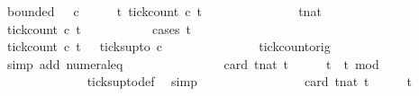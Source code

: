\begin{isabellebody}
\isanewline
{}\isamarkupfalse%
\ {\isacartoucheopen}bounded\ {}\ {}\ c{}{\isacartoucheclose}\isanewline
%
\isadelimproof
%
\endisadelimproof
%
\isatagproof
{}\isamarkupfalse%
\ {\isacharminus}\isanewline
\ \ \isamarkupfalse%
\ {\isacartoucheopen}{\isasymforall}t{\isachardot}\ tick{\isacharunderscore}count\ c{}\ t\ {}\ {\isasymle}\ {}{\isacartoucheclose}\isanewline
\ \ \isamarkupfalse%
\ {\isacharminus}\isanewline
\ \ \ \ \isacommand{{\isacharbraceleft}}\isamarkupfalse%
\ \isamarkupfalse%
\ tnat\isanewline
\ \ \ \ \ \ \isamarkupfalse%
\ {\isacartoucheopen}tick{\isacharunderscore}count\ c{}\ t\ {}\ {\isasymle}\ {}{\isacartoucheclose}\isanewline
\ \ \ \ \ \ \isamarkupfalse%
\ {\isacharparenleft}cases\ t\isanewline
\ \ \ \ \ \ \ \ \isamarkupfalse%
\ {}\isanewline
\ \ \ \ \ \ \ \ \ \ \isamarkupfalse%
\ {\isacartoucheopen}tick{\isacharunderscore}count\ c{}\ t\ {}\ {\isacharequal}\ ticks{\isacharunderscore}up{\isacharunderscore}to\ c{}\ {}{\isacartoucheclose}\isanewline
\ \ \ \ \ \ \ \ \ \ \ \ \isamarkupfalse%
\ tick{\isacharunderscore}count{\isacharunderscore}orig\ \isamarkupfalse%
\ {\isacharparenleft}simp\ add{\isacharcolon}\ numeral{\isacharunderscore}{}{\isacharunderscore}eq{\isacharunderscore}{}{\isacharparenright}\isanewline
\ \ \ \ \ \ \ \ \ \ \isamarkupfalse%
\ \isamarkupfalse%
\ {\isacartoucheopen}{\isachardot}{\isachardot}{\isachardot}\ {\isacharequal}\ card\ {\isacharbraceleft}t{\isacharcolon}{\isacharcolon}nat{\isachardot}\ t\ {\isasymle}\ {}\ {\isasymand}\ {}\ {\isasymle}\ t\ {\isasymand}\ {\isacharparenleft}t{\isacharminus}{}{\isacharparenright}\ mod\ {}\ {\isacharequal}\ {}{\isacharbraceright}{\isacartoucheclose}\isanewline
\ \ \ \ \ \ \ \ \ \ \ \ \isamarkupfalse%
\ ticks{\isacharunderscore}up{\isacharunderscore}to{\isacharunderscore}def\ \isamarkupfalse%
\ simp\isanewline
\ \ \ \ \ \ \ \ \ \ \isamarkupfalse%
\ \isamarkupfalse%
\ {\isacartoucheopen}{\isachardot}{\isachardot}{\isachardot}\ {\isasymle}\ \ card\ {\isacharbraceleft}t{\isacharcolon}{\isacharcolon}nat{\isachardot}\ t\ {\isasymle}\ {}\ {\isasymand}\ {}\ {\isasymle}\ t{\isacharbraceright}{\isacartoucheclose}\isanewline

\end{isabellebody}
